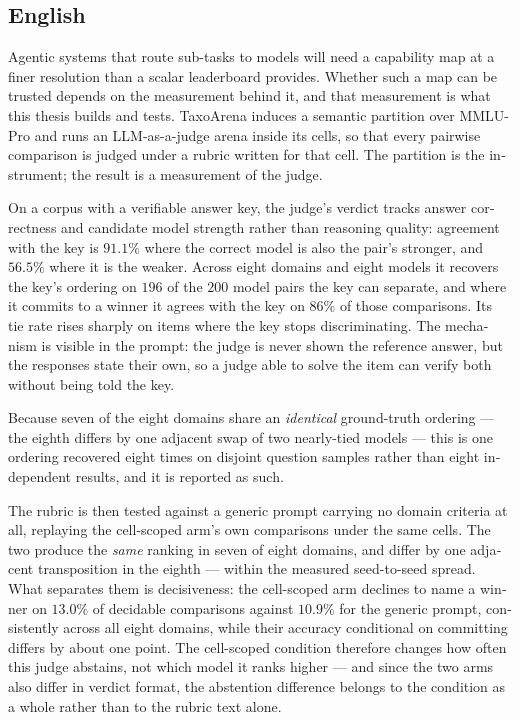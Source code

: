 \begin{otherlanguage}{english}
\section*{English}
Agentic systems that route sub-tasks to models will need a capability
map at a finer resolution than a scalar leaderboard provides. Whether
such a map can be trusted depends on the measurement behind it, and
that measurement is what this thesis builds and tests. TaxoArena
induces a semantic partition over MMLU-Pro and runs an
LLM-as-a-judge arena inside its cells, so that every pairwise
comparison is judged under a rubric written for that cell. The
partition is the instrument; the result is a measurement of the judge.

On a corpus with a verifiable answer key, the judge's verdict tracks
answer correctness and candidate model strength rather than reasoning
quality: agreement with the key is $91.1\%$ where the correct model is
also the pair's stronger, and $56.5\%$ where it is the weaker. Across eight domains
and eight models it recovers the key's ordering on $196$ of the $200$
model pairs the key can separate, and where it commits to a winner it
agrees with the key on $86\%$ of those comparisons. Its tie rate rises
sharply on items where the key stops discriminating. The
mechanism is visible in the prompt: the judge is never shown the
reference answer, but the responses state their own, so a judge able to
solve the item can verify both without being told the key.

Because seven of the eight domains share an \emph{identical}
ground-truth ordering --- the eighth differs by one adjacent swap of
two nearly-tied models --- this is one ordering recovered eight times
on disjoint question samples rather than eight independent results,
and it is reported as such.

The rubric is then tested against a generic prompt carrying no domain
criteria at all, replaying the cell-scoped arm's own comparisons under
the same cells. The two produce the \emph{same} ranking in seven of eight
domains, and differ by one adjacent transposition in the eighth ---
within the measured seed-to-seed spread. What separates them is
decisiveness: the cell-scoped arm declines
to name a winner on $13.0\%$ of decidable comparisons against $10.9\%$
for the generic prompt, consistently across all eight domains, while
their accuracy conditional on committing differs by about one point.
The cell-scoped condition therefore changes how often this judge
abstains, not which model it ranks higher --- and since the two arms
also differ in verdict format, the abstention difference belongs to
the condition as a whole rather than to the rubric text alone.


\end{otherlanguage}
